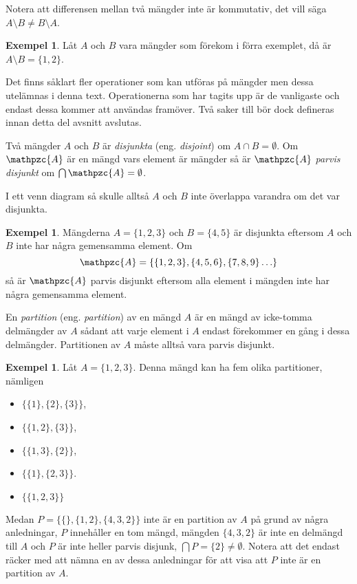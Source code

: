 \documentclass{article}
\theoremstyle{definition}
\newtheorem{exmp}[thm]{Exempel}
\begin{document}
Notera att differensen mellan två mängder inte är kommutativ, det vill säga 
$A \setminus B \neq B \setminus A$.
\begin{exmp}
  Låt $A$ och $B$ vara mängder som förekom i förra exemplet, då är $A \setminus B
  = \{1, 2\}$.  
\end{exmp}
Det finns såklart fler operationer som kan utföras på mängder men 
\linebreak
dessa utelämnas i denna 
text. 
Operationerna som har tagits upp är de vanligaste och endast dessa kommer 
att användas framöver. Två saker till bör dock defineras innan detta del avsnitt avslutas. 

\begin{mydef}{}{}
  Två mängder $A$ och $B$ är \textit{disjunkta} (eng. \textit{disjoint}) om $A \cap B = \emptyset$. Om $\mathpzc{A}$ är 
  en mängd vars element är mängder så är $\mathpzc{A}$ \textit{parvis disjunkt} om $\bigcap \mathpzc{A} = 
  \emptyset$.
\end{mydef}
I ett venn diagram så skulle alltså $A$ och $B$ inte överlappa varandra
om det var disjunkta. 
\begin{exmp}
  Mängderna $A = \{1, 2, 3\}$ och $B = \{4, 5\}$ 
  är disjunkta eftersom $A$ och $B$ inte har några gemensamma element. 
  Om 
  \[\mathpzc{A} = \{\{1, 2, 3\}, \{4, 5, 6\}, \{7, 8, 9\}\ldots\}\] 
  så är $\mathpzc{A}$ parvis disjunkt eftersom alla element i mängden 
  inte har några gemensamma element. 
\end{exmp}

\begin{mydef}{}{}
  En \textit{partition} (eng. \textit{partition}) av en mängd $A$ är en mängd av icke-tomma delmängder av $A$ sådant att 
  varje element i $A$ endast förekommer en gång i dessa delmängder. 
  Partitionen av $A$ måste alltså vara parvis disjunkt.
\end{mydef}
\begin{exmp}
  Låt $A = \{1, 2, 3\}$. Denna mängd kan ha fem olika partitioner, nämligen
\begin{itemize}
  \item $\{\{1\}, \{2\}, \{3\}\}$,
  \item $\{ \{1, 2\}, \{3\} \}$,
  \item $\{ \{1, 3\}, \{2\} \}$,
  \item $\{ \{1\}, \{2, 3\} \}$.
  \item $\{ \{1, 2, 3\} \}$
\end{itemize}
Medan $ P = \{ \{\}, \{1, 2\}, \{4, 3, 2\} \}$ inte är en partition av $A$ på grund av några anledningar, $P$ innehåller en tom mängd, mängden $\{4, 3, 2\}$ är inte en delmängd till $A$
och $P$ är inte heller parvis disjunk, $\bigcap P = \{2\} \neq \emptyset$. Notera att det endast räcker med att nämna en av dessa anledningar för att visa att $P$ inte är en partition av $A$.
\end{exmp}
\end{document}
